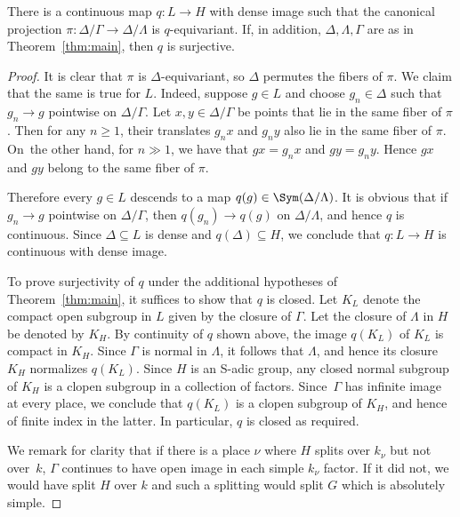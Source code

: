 \begin{prop}\label{prop-contclosed}\label{prop:LtoH}
There is a continuous map $q:L\to H$ with dense image such that the canonical projection $\pi: \Delta / \Gamma\to \Delta / \Lambda$ is $q$-equivariant.
If, in addition, $\Delta, \Lambda, \Gamma$ are as in Theorem~\ref{thm:main}, then $q$ is surjective.
\end{prop}
\begin{proof} It is clear that $\pi$ is $\Delta$-equivariant, so $\Delta$ permutes the fibers of $\pi$. We claim that the same is true for $L$. Indeed, suppose $g\in L$ and choose $g_n\in\Delta$ such that $g_n\to g$ pointwise on $\Delta/\Gamma$. Let $x,y\in\Delta/\Gamma$ be points that lie in the same fiber of $\pi$. Then for any $n\geq 1$, their translates $g_n x$ and $g_n y$ also lie in the same fiber of $\pi$. On~the other hand, for $n \gg 1$, we have that $g x = g_n x$ and $g y = g_n y$. Hence $gx$ and $gy$ belong to the same fiber of $\pi$.

Therefore every $g\in L$ descends to a map $q(g)\in \Sym(\Delta/\Lambda)$. It is obvious that if $g_n\to g$ pointwise on $\Delta/\Gamma$, then $q(g_n)\to q(g)$ on $\Delta/\Lambda$, and hence $q$ is continuous. Since $\Delta\subseteq L$ is dense and $q(\Delta)\subseteq H$, we conclude that $q:L\to H$ is continuous with dense image.

To prove surjectivity of $q$ under the additional hypotheses of
Theorem~\ref{thm:main}, it suffices to show that $q$ is closed.
Let $K_L$ denote the compact open subgroup in $L$ given by the closure of $\Gamma$. Let the closure of $\Lambda$ in $H$ be denoted by $K_H$.
By continuity of $ q$ shown above, the image $q(K_L)$ of $K_L$ is compact in $K_H$.
Since $\Gamma$ is normal in $\Lambda$, it follows that $\Lambda$, and hence its closure $K_H$
normalizes $q(K_L)$.
Since $H$ is an S-adic group, any closed normal subgroup of $K_H$ is a clopen subgroup in a collection of factors. Since~$\Gamma$ has infinite image at every place, we conclude that $q(K_L)$ is a clopen subgroup of $K_H$, and hence
of finite index in the latter. In particular, $q$ is closed as required.

We remark for clarity that if there is a place $\nu$ where $H$ splits over $k_{\nu}$ but not over~$k$, $\Gamma$ continues to have open image in each simple $k_{\nu}$ factor. If it did not, we would have split $H$ over $k$ and such a splitting would split $G$ which is absolutely simple.
\end{proof}


